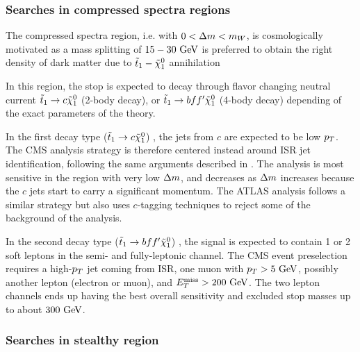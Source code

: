     \subsubsection{Searches in compressed spectra regions}

    The compressed spectra region, i.e. with $0 < \Delta m < m_{W}$, is
    cosmologically motivated as a mass splitting of $15-30~\text{GeV}$ is preferred to
    obtain the right density of dark matter due to $\tilde{t}_1-\tilde{\chi}_1^0$
    annihilation \cite{TheLightStopWindow,SUSYBaryogenesis}

    In this region, the stop is expected to decay through flavor changing
    neutral current $\tilde{t}_1 \rightarrow c \tilde{\chi}_1^0$ (2-body decay), or
    $\tilde{t}_1 \rightarrow bff' \tilde{\chi}_1^0$ (4-body decay) depending of the exact
    parameters of the theory.

    In the first decay type ($\tilde{t}_1 \rightarrow c \tilde{\chi}_1^0$)
    \cite{SUS-14-001, ATLASstopSearches}, the jets from $c$ are expected to be
    low $p_T$. The CMS analysis strategy is therefore centered instead around
    ISR jet identification, following the same arguments described in
    . The analysis is most sensitive in the region with
    very low $\Delta m$, and decreases as $\Delta m$ increases because the $c$
    jets start to carry a significant momentum. The ATLAS analysis follows a
    similar strategy but also uses $c$-tagging techniques to reject some of the
    background of the analysis.

    In the second decay type ($\tilde{t}_1 \rightarrow bff' \tilde{\chi}_1^0$)
    \cite{SUS-14-021, ATLASstopSearches}, the signal is expected to contain 1 or
    2 soft leptons in the semi- and fully-leptonic channel.  The CMS event
    preselection requires a high-$p_T$ jet coming from ISR, one muon with $p_T >
    5~\text{GeV}$, possibly another lepton (electron or muon), and $E_T^\text{miss} > 200~\text{GeV}$.
    The two lepton channels ends up having the best overall sensitivity and
    excluded stop masses up to about $300~\text{GeV}$.

    \subsubsection{Searches in stealthy region}

